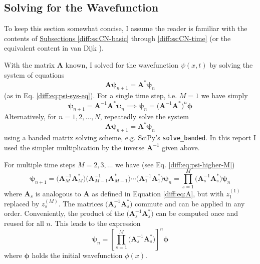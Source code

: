 \documentclass[11pt, a4paper]{article}
\newcommand{\mat}[1]{\mathbf{#1}}
\begin{document}
\subsection{Solving for the Wavefunction}
To keep this section somewhat concise, I assume the reader is familiar with the contents of \hyperref[diff:ss:CN-basic]{Subsections \ref{diff:ss:CN-basic}} through \ref{diff:ss:CN-time} (or the equivalent content in van Dijk \cite{vandijk}).

\vspace{1mm}
With the matrix $ \mat{A} $ known, I solved for the wavefunction $ \psi(x, t) $ by solving the system of equations
\begin{equation*}
	\mat{A}\bm{\psi}_{n+1} = \mat{A}^{*}\bm{\psi}_{n}
\end{equation*}
(as in Eq. \ref{diff:eq:psi-sys-eq}). For a single time step, i.e. $ M = 1 $ we have simply
\begin{equation*}
	\bm{\psi}_{n+1} = \mat{A}^{-1}\mat{A}^{*}\bm{\psi}_{n} \implies \bm{\psi}_{n} = \big(\mat{A}^{-1}\mat{A}^{*}\big)^{n} \bm{\phi}
\end{equation*}
Alternatively, for $ n = 1, 2, \ldots, N $, repeatedly solve the system
\begin{equation*}
 \mat{A}\bm{\psi}_{n+1} = \mat{A}^{*}\bm{\psi}_{n}
\end{equation*}
using a banded matrix solving scheme, e.g. SciPy's \texttt{solve\_banded}. In this report I used the simpler multiplication by the inverse $ \mat{A}^{-1} $ given above.

\vspace{2mm}
For multiple time steps $ M = 2, 3, \ldots $ we have (see Eq. \ref{diff:eq:psi-higher-M})
\begin{equation*}
	\bm{\psi}_{n+1} = \big(\mat{A}_{M}^{-1}\mat{A}_{M}^{*}\big)\big(\mat{A}_{M-1}^{-1}\mat{A}_{M-1}^{*}\big)\cdots \big(\mat{A}_{1}^{-1}\mat{A}_{1}^{*}\big)\bm{\psi}_{n} = \prod_{s=1}^{M}\big(\mat{A}_{s}^{-1}\mat{A}_{s}^{*}\big) \bm{\psi}_{n}
\end{equation*}
where $ \mat{A}_{s} $ is analogous to $ \mat{A} $ as defined in Equation \ref{diff:eq:A}, but with $ z_{1}^{(1)} $ replaced by $ z_{s}^{(M)} $. The matrices $ \big(\mat{A}_{s}^{-1}\mat{A}_{s}^{*}\big) $ commute and can be applied in any order. Conveniently, the product of the $ \big(\mat{A}_{s}^{-1}\mat{A}_{s}^{*}\big) $ can be computed once and reused for all $ n $. This leads to the expression
\begin{equation*}
	\bm{\psi}_{n} = \left[\prod_{s=1}^{M}\big(\mat{A}_{s}^{-1}\mat{A}_{s}^{*}\big)\right]^{n} \bm{\phi}
\end{equation*}
where $ \bm{\phi} $ holds the initial wavefunction $ \phi(x) $.
\end{document}
